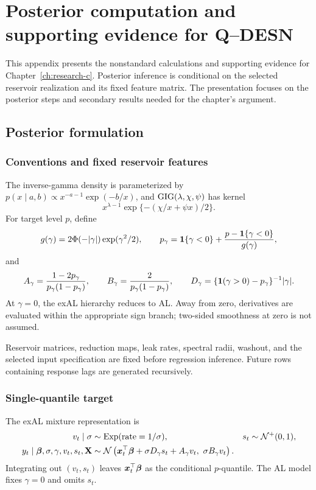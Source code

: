 \chapter{Posterior computation and supporting evidence for Q--DESN}
\label{app:qdesn-technical}

This appendix presents the nonstandard calculations and supporting evidence
for Chapter~\ref{ch:research-c}. Posterior inference is conditional on the
selected reservoir realization and its fixed feature matrix. The presentation
focuses on the posterior steps and secondary results needed for the chapter's
argument.

\section{Posterior formulation}
\label{app:qdesn-posterior}

\subsection{Conventions and fixed reservoir features}

The inverse-gamma density is parameterized by
\(p(x\mid a,b)\propto x^{-a-1}\exp(-b/x)\), and
\(\operatorname{GIG}(\lambda,\chi,\psi)\) has kernel
\[
x^{\lambda-1}\exp\{-(\chi/x+\psi x)/2\}.
\]
For target level \(p\), define
\[
g(\gamma)=2\Phi(-|\gamma|)\exp(\gamma^2/2),\qquad
p_\gamma=\mathbf{1}\{\gamma<0\}
+\frac{p-\mathbf{1}\{\gamma<0\}}{g(\gamma)},
\]
and
\[
A_\gamma=\frac{1-2p_\gamma}{p_\gamma(1-p_\gamma)},\qquad
B_\gamma=\frac{2}{p_\gamma(1-p_\gamma)},\qquad
D_\gamma=\{\mathbf{1}(\gamma>0)-p_\gamma\}^{-1}|\gamma|.
\]
At \(\gamma=0\), the exAL hierarchy reduces to AL. Away from zero,
derivatives are evaluated within the appropriate sign branch; two-sided
smoothness at zero is not assumed.

Reservoir matrices, reduction maps, leak rates, spectral radii, washout, and
the selected input specification are fixed before regression inference.
Future rows containing response lags are generated recursively.

\subsection{Single-quantile target}

The exAL mixture representation is
\begin{align}
v_t\mid\sigma&\sim\operatorname{Exp}(\text{rate}=1/\sigma),&
s_t&\sim\mathcal{N}^{+}(0,1),\nonumber\\
y_t\mid\boldsymbol{\beta},\sigma,\gamma,v_t,s_t,\mathbf{X}
&\sim\mathcal{N}\left(
\boldsymbol{x}_t^\top\boldsymbol{\beta}+\sigma D_\gamma s_t+A_\gamma v_t,
\ \sigma B_\gamma v_t\right).
\label{qdesn2026:eq:supp_exal_hierarchy}
\end{align}
Integrating out \((v_t,s_t)\) leaves
\(\boldsymbol{x}_t^\top\boldsymbol{\beta}\) as the conditional \(p\)-quantile. The AL
model fixes \(\gamma=0\) and omits \(s_t\).

